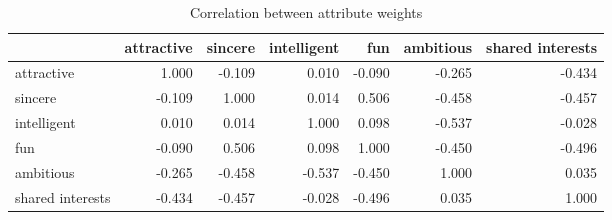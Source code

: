 \begin{table}[htbp]
\centering
\caption{Correlation between attribute weights}
\label{tab:q3_correlation}
\begin{tabular}{lrrrrrr}
\toprule
 & attractive & sincere & intelligent & fun & ambitious & shared interests \\
\midrule
attractive & 1.000 & -0.109 & 0.010 & -0.090 & -0.265 & -0.434 \\
sincere & -0.109 & 1.000 & 0.014 & 0.506 & -0.458 & -0.457 \\
intelligent & 0.010 & 0.014 & 1.000 & 0.098 & -0.537 & -0.028 \\
fun & -0.090 & 0.506 & 0.098 & 1.000 & -0.450 & -0.496 \\
ambitious & -0.265 & -0.458 & -0.537 & -0.450 & 1.000 & 0.035 \\
shared interests & -0.434 & -0.457 & -0.028 & -0.496 & 0.035 & 1.000 \\
\bottomrule
\end{tabular}
\end{table}
